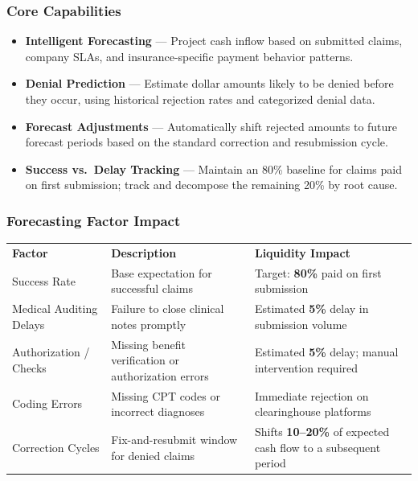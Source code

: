\documentclass[11pt,a4paper]{article}
\begin{document}
\subsubsection{Core Capabilities}

\begin{itemize}
  \item \textbf{Intelligent Forecasting} --- Project cash inflow based on submitted claims,
        company SLAs, and insurance-specific payment behavior patterns.
  \item \textbf{Denial Prediction} --- Estimate dollar amounts likely to be denied before
        they occur, using historical rejection rates and categorized denial data.
  \item \textbf{Forecast Adjustments} --- Automatically shift rejected amounts to future
        forecast periods based on the standard correction and resubmission cycle.
  \item \textbf{Success vs.\ Delay Tracking} --- Maintain an 80\% baseline for claims paid
        on first submission; track and decompose the remaining 20\% by root cause.
\end{itemize}

\subsubsection{Forecasting Factor Impact}

\begin{center}
\begin{tabularx}{\linewidth}{L{3.2cm} X L{4.5cm}}
  \color{white}\textbf{Factor} & \color{white}\textbf{Description} & \color{white}\textbf{Liquidity Impact} \\
  Success Rate &
    Base expectation for successful claims &
    Target: \textbf{80\%} paid on first submission \\
  Medical Auditing Delays &
    Failure to close clinical notes promptly &
    Estimated \textbf{5\%} delay in submission volume \\
  Authorization / Checks &
    Missing benefit verification or authorization errors &
    Estimated \textbf{5\%} delay; manual intervention required \\
  Coding Errors &
    Missing CPT codes or incorrect diagnoses &
    Immediate rejection on clearinghouse platforms \\
  Correction Cycles &
    Fix-and-resubmit window for denied claims &
    Shifts \textbf{10--20\%} of expected cash flow to a subsequent period \\
\end{tabularx}
\end{center}
\end{document}

